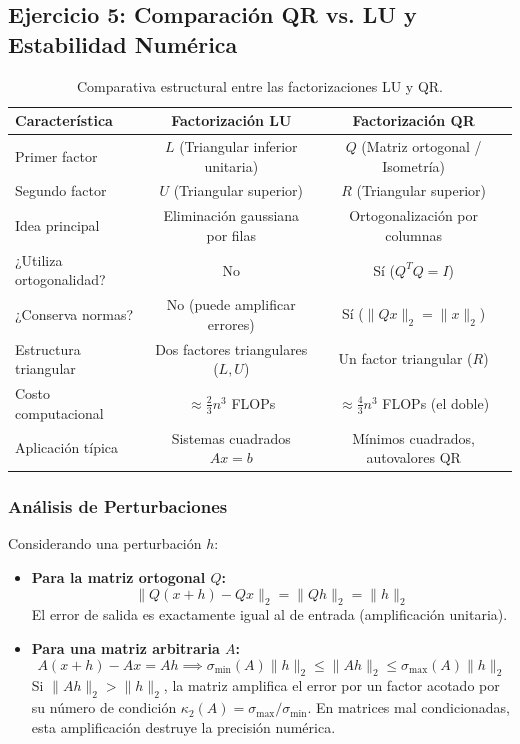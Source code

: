 \documentclass[11pt,a4paper]{article}
\theoremstyle{definition}
\theoremstyle{remark}
\begin{document}
\subsection{Ejercicio 5: Comparación QR vs. LU y Estabilidad Numérica}

\begin{table}[h!]
    \centering
    \small
    \caption{Comparativa estructural entre las factorizaciones LU y QR.}
    \label{tab:comparativa_lu_qr}
    \begin{tabular}{lcc}
        \toprule
        \textbf{Característica} & \textbf{Factorización LU} & \textbf{Factorización QR} \\
        \midrule
        Primer factor & $L$ (Triangular inferior unitaria) & $Q$ (Matriz ortogonal / Isometría) \\
        Segundo factor & $U$ (Triangular superior) & $R$ (Triangular superior) \\
        Idea principal & Eliminación gaussiana por filas & Ortogonalización por columnas \\
        ¿Utiliza ortogonalidad? & No & Sí ($Q^T Q = I$) \\
        ¿Conserva normas? & No (puede amplificar errores) & Sí ($\|Qx\|_2 = \|x\|_2$) \\
        Estructura triangular & Dos factores triangulares ($L, U$) & Un factor triangular ($R$) \\
        Costo computacional & $\approx \frac{2}{3} n^3$ FLOPs & $\approx \frac{4}{3} n^3$ FLOPs (el doble) \\
        Aplicación típica & Sistemas cuadrados $Ax = b$ & Mínimos cuadrados, autovalores QR \\
        \bottomrule
    \end{tabular}
\end{table}

\subsubsection{Análisis de Perturbaciones}
Considerando una perturbación $h$:
\begin{itemize}[leftmargin=*]
    \item \textbf{Para la matriz ortogonal $Q$:}
    \begin{equation}
        \|Q(x+h) - Qx\|_2 = \|Qh\|_2 = \|h\|_2
    \end{equation}
    El error de salida es exactamente igual al de entrada (amplificación unitaria).
    \item \textbf{Para una matriz arbitraria $A$:}
    \begin{equation}
        A(x+h) - Ax = Ah \implies \sigma_{\min}(A)\|h\|_2 \le \|Ah\|_2 \le \sigma_{\max}(A)\|h\|_2
    \end{equation}
    Si $\|Ah\|_2 > \|h\|_2$, la matriz amplifica el error por un factor acotado por su número de condición $\kappa_2(A) = \sigma_{\max} / \sigma_{\min}$. En matrices mal condicionadas, esta amplificación destruye la precisión numérica.
\end{itemize}
\end{document}
